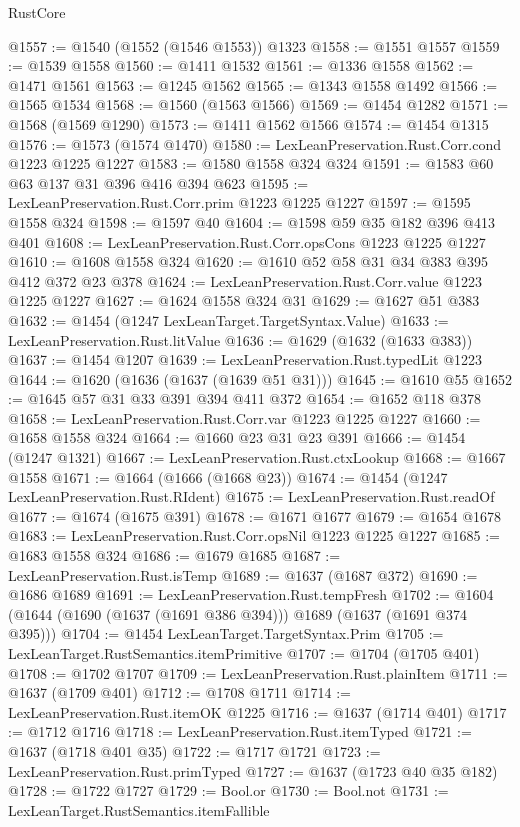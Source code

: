\begin{lexlean}{RustCore}
\begin{coremodule}
@1557 := @1540 (@1552 (@1546 @1553)) @1323
@1558 := @1551 @1557
@1559 := @1539 @1558
@1560 := @1411 @1532
@1561 := @1336 @1558
@1562 := @1471 @1561
@1563 := @1245 @1562
@1565 := @1343 @1558 @1492
@1566 := @1565 @1534
@1568 := @1560 (@1563 @1566)
@1569 := @1454 @1282
@1571 := @1568 (@1569 @1290)
@1573 := @1411 @1562 @1566
@1574 := @1454 @1315
@1576 := @1573 (@1574 @1470)
@1580 := LexLeanPreservation.Rust.Corr.cond @1223 @1225 @1227
@1583 := @1580 @1558 @324 @324
@1591 := @1583 @60 @63 @137 @31 @396 @416 @394 @623
@1595 := LexLeanPreservation.Rust.Corr.prim @1223 @1225 @1227
@1597 := @1595 @1558 @324
@1598 := @1597 @40
@1604 := @1598 @59 @35 @182 @396 @413 @401
@1608 := LexLeanPreservation.Rust.Corr.opsCons @1223 @1225 @1227
@1610 := @1608 @1558 @324
@1620 := @1610 @52 @58 @31 @34 @383 @395 @412 @372 @23 @378
@1624 := LexLeanPreservation.Rust.Corr.value @1223 @1225 @1227
@1627 := @1624 @1558 @324 @31
@1629 := @1627 @51 @383
@1632 := @1454 (@1247 LexLeanTarget.TargetSyntax.Value)
@1633 := LexLeanPreservation.Rust.litValue
@1636 := @1629 (@1632 (@1633 @383))
@1637 := @1454 @1207
@1639 := LexLeanPreservation.Rust.typedLit @1223
@1644 := @1620 (@1636 (@1637 (@1639 @51 @31)))
@1645 := @1610 @55
@1652 := @1645 @57 @31 @33 @391 @394 @411 @372
@1654 := @1652 @118 @378
@1658 := LexLeanPreservation.Rust.Corr.var @1223 @1225 @1227
@1660 := @1658 @1558 @324
@1664 := @1660 @23 @31 @23 @391
@1666 := @1454 (@1247 @1321)
@1667 := LexLeanPreservation.Rust.ctxLookup
@1668 := @1667 @1558
@1671 := @1664 (@1666 (@1668 @23))
@1674 := @1454 (@1247 LexLeanPreservation.Rust.RIdent)
@1675 := LexLeanPreservation.Rust.readOf
@1677 := @1674 (@1675 @391)
@1678 := @1671 @1677
@1679 := @1654 @1678
@1683 := LexLeanPreservation.Rust.Corr.opsNil @1223 @1225 @1227
@1685 := @1683 @1558 @324
@1686 := @1679 @1685
@1687 := LexLeanPreservation.Rust.isTemp
@1689 := @1637 (@1687 @372)
@1690 := @1686 @1689
@1691 := LexLeanPreservation.Rust.tempFresh
@1702 := @1604 (@1644 (@1690 (@1637 (@1691 @386 @394))) @1689 (@1637 (@1691 @374 @395)))
@1704 := @1454 LexLeanTarget.TargetSyntax.Prim
@1705 := LexLeanTarget.RustSemantics.itemPrimitive
@1707 := @1704 (@1705 @401)
@1708 := @1702 @1707
@1709 := LexLeanPreservation.Rust.plainItem
@1711 := @1637 (@1709 @401)
@1712 := @1708 @1711
@1714 := LexLeanPreservation.Rust.itemOK @1225
@1716 := @1637 (@1714 @401)
@1717 := @1712 @1716
@1718 := LexLeanPreservation.Rust.itemTyped
@1721 := @1637 (@1718 @401 @35)
@1722 := @1717 @1721
@1723 := LexLeanPreservation.Rust.primTyped
@1727 := @1637 (@1723 @40 @35 @182)
@1728 := @1722 @1727
@1729 := Bool.or
@1730 := Bool.not
@1731 := LexLeanTarget.RustSemantics.itemFallible

\end{coremodule}
\end{lexlean}
